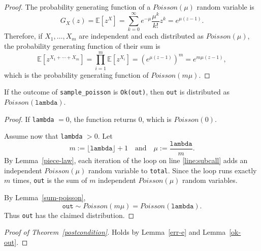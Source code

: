 \documentclass{article}
\begin{document}
\begin{proof}
The probability generating function of a $Poisson(\mu)$ random variable is
\[
G_X(z) = \mathbb{E}[z^X] = \sum_{k=0}^\infty e^{-\mu}\frac{\mu^k}{k!}z^k = e^{\mu(z-1)}.
\]
Therefore, if $X_1,\ldots,X_m$ are independent and each distributed as $Poisson(\mu)$,
the probability generating function of their sum is
\[
\mathbb{E}[z^{X_1+\cdots+X_m}]
=
\prod_{i=1}^m \mathbb{E}[z^{X_i}]
=
\left(e^{\mu(z-1)}\right)^m
=
e^{m\mu(z-1)},
\]
which is the probability generating function of $Poisson(m\mu)$.
\end{proof}

\begin{lemma}
\label{ok-out}
If the outcome of \texttt{sample\_poisson} is \texttt{Ok(out)}, then \texttt{out} is distributed as $Poisson(\texttt{lambda})$.
\end{lemma}

\begin{proof}
If \texttt{lambda} $= 0$, the function returns $0$, which is $Poisson(0)$.

Assume now that \texttt{lambda} $> 0$. Let
\[
m := \lfloor \texttt{lambda} \rfloor + 1
\quad\text{and}\quad
\mu := \frac{\texttt{lambda}}{m}.
\]
By Lemma~\ref{piece-law}, each iteration of the loop on line \ref{line:subcall} adds an
independent $Poisson(\mu)$ random variable to \texttt{total}. Since the loop runs exactly $m$
times, \texttt{out} is the sum of $m$ independent $Poisson(\mu)$ random variables.

By Lemma~\ref{sum-poisson},
\[
\texttt{out} \sim Poisson(m\mu) = Poisson(\texttt{lambda}).
\]
Thus \texttt{out} has the claimed distribution.
\end{proof}

\begin{proof}[Proof of Theorem~\ref{postcondition}]
Holds by Lemma~\ref{err-e} and Lemma~\ref{ok-out}.
\end{proof}



\end{document}
